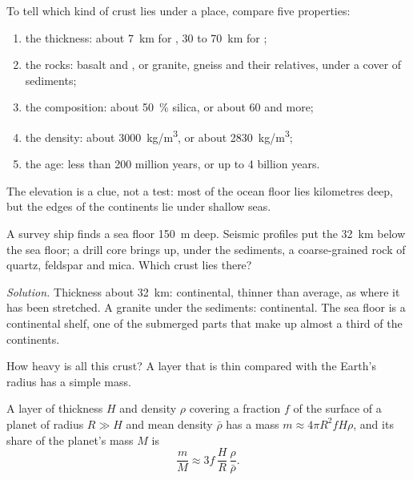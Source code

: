 \begin{method}\label{met:g12:continental-crust:compare}
To tell which kind of crust lies under a place, compare five properties:
\begin{enumerate}
  \item the thickness: about \qty{7}{km} for , 30 to
        \qty{70}{km} for ;
  \item the rocks: basalt and , or granite, gneiss and their
        relatives, under a cover of sediments;
  \item the composition: about \qty{50}{\percent} silica, or about 60 and
        more;
  \item the density: about \qty{3000}{kg/m^3}, or about \qty{2830}{kg/m^3};
  \item the age: less than 200 million years, or up to 4 billion years.
\end{enumerate}
The elevation is a clue, not a test: most of the ocean floor lies
kilometres deep, but the edges of the continents lie under shallow seas.
\end{method}

\begin{example}\label{ex:g12:continental-crust:shelf}
A survey ship finds a sea floor \qty{150}{m} deep. Seismic profiles put the
 \qty{32}{km} below the sea floor; a drill core brings up, under the
sediments, a coarse-grained rock of quartz, feldspar and mica. Which crust
lies there?

\emph{Solution.} Thickness about \qty{32}{km}: continental, thinner than
average, as where it has been stretched. A granite under the sediments:
continental. The sea floor is a continental shelf, one of the submerged
parts that make up almost a third of the continents.
\end{example}

How heavy is all this crust? A layer that is thin compared with the Earth's
radius has a simple mass.

\begin{proposition}\label{prop:g12:continental-crust:thin-layer}
A layer of thickness $H$ and density $\rho$ covering a fraction $f$ of the
surface of a planet of radius $R \gg H$ and mean density $\bar\rho$ has a
mass $m \approx 4\pi R^2 f H \rho$, and its share of the planet's mass $M$ is
\[
  \frac{m}{M} \approx 3 f\,\frac{H}{R}\,\frac{\rho}{\bar\rho}.
\]
\end{proposition}

